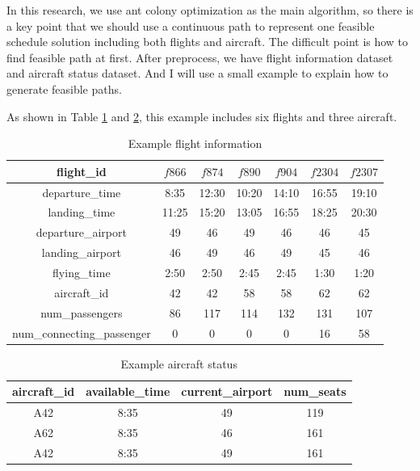 \documentclass[senior]{IPSstyle}
\begin{document}
In this research, we use ant colony optimization as the main algorithm, so there is a key point that we should use a continuous path to represent one feasible schedule solution including both flights and aircraft. The difficult point is how to find feasible path at first. After preprocess, we have flight information dataset and aircraft status dataset. And I will use a small example to explain how to generate feasible paths. 

As shown in Table \ref{Example flight information} and \ref{Example aircraft status}, this example includes six flights and three aircraft.

\begin{table}[h]
\renewcommand{\arraystretch}{1.2}
\caption{Example flight information}
\label{Example flight information}
\begin{center}
\begin{tabular}{|c|c|c|c|c|c|c|}
\hline
\multicolumn{1}{|c|}{flight\_id}
&\multicolumn{1}{c|}{\(f866\)}
&\multicolumn{1}{c|}{\(f874\)}
&\multicolumn{1}{c|}{\(f890\)}
&\multicolumn{1}{c|}{\(f904\)}
&\multicolumn{1}{c|}{\(f2304\)}
&\multicolumn{1}{c|}{\(f2307\)}
\\  \hline
departure\_time & 8:35 & 12:30 & 10:20 & 14:10 & 16:55 & 19:10
\\	\hline
landing\_time & 11:25 & 15:20 & 13:05 & 16:55 & 18:25 & 20:30
\\	\hline
departure\_airport & 49 & 46 & 49 & 46 & 46 & 45
\\  \hline
landing\_airport & 46 & 49 & 46 & 49 & 45 & 46
\\  \hline
flying\_time & 2:50 & 2:50 & 2:45 & 2:45 & 1:30 & 1:20
\\  \hline
aircraft\_id & 42 & 42 & 58 & 58 & 62 & 62
\\  \hline
num\_passengers & 86 & 117 & 114 & 132 & 131 & 107
\\  \hline
num\_connecting\_passenger & 0 & 0 & 0 & 0 & 16 & 58
\\  \hline
\end{tabular}
\end{center}
\end{table}

\begin{table}[h]
\renewcommand{\arraystretch}{1}
\caption{Example aircraft status}
\label{Example aircraft status}
\begin{center}
\begin{tabular}{|c|c|c|c|}
\hline
\multicolumn{1}{|c|}{aircraft\_id}
&\multicolumn{1}{c|}{available\_time}
&\multicolumn{1}{c|}{current\_airport}
&\multicolumn{1}{c|}{num_seats}

\\  \hline
A42 & 8:35 & 49 & 119
\\	\hline
A62 & 8:35 & 46 & 161
\\	\hline
A42 & 8:35 & 49 & 161
\\  \hline
\end{tabular}
\end{center}
\end{table}
\end{document}
